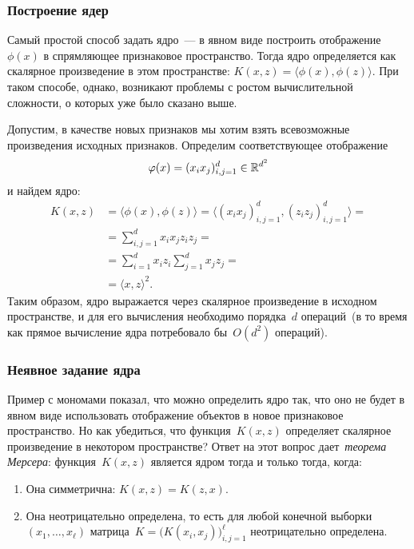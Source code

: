 \documentclass[12pt,fleqn]{article}
\begin{document}
\subsubsection{Построение ядер}
Самый простой способ задать ядро~--- в явном виде построить
отображение~$\phi(x)$ в спрямляющее признаковое пространство.
Тогда ядро определяется как скалярное произведение в этом
пространстве: $K(x, z) = \langle \phi(x), \phi(z) \rangle$.
При таком способе, однако, возникают проблемы с ростом вычислительной сложности,
о которых уже было сказано выше.

Допустим, в качестве новых признаков мы хотим взять всевозможные
произведения исходных признаков.
Определим соответствующее отображение
\[
    \varphi(x)
    =
    (x_i x_j)_{i, j = 1}^{d}
    \in
    \mathbb{R}^{d^2}
\]
и найдем ядро:
\begin{align*}
    K(x, z)
    &=
    \langle \phi(x), \phi(z) \rangle
    =
    \langle (x_i x_j)_{i, j = 1}^{d}, (z_i z_j)_{i, j = 1}^{d} \rangle
    =\\
    &=
    \sum_{i, j = 1}^{d}
        x_i x_j z_i z_j
    =\\
    &=
    \sum_{i = 1}^{d} x_i z_i
    \sum_{j = 1}^{d} x_j z_j
    =\\
    &=
    \langle x, z \rangle^2.
\end{align*}
Таким образом, ядро выражается через скалярное произведение
в исходном пространстве,
и для его вычисления необходимо порядка~$d$ операций~(в то время
как прямое вычисление ядра потребовало бы~$O(d^2)$ операций).

\subsubsection{Неявное задание ядра}
Пример с мономами показал, что можно определить ядро так,
что оно не будет в явном виде использовать отображение объектов
в новое признаковое пространство.
Но как убедиться, что функция~$K(x, z)$ определяет скалярное
произведение в некотором пространстве?
Ответ на этот вопрос дает~\emph{теорема Мерсера}:
функция~$K(x, z)$ является ядром тогда и только тогда, когда:
\begin{enumerate}
    \item Она симметрична: $K(x, z) = K(z, x)$.
    \item Она неотрицательно определена, то есть для
        любой конечной выборки~$(x_1, \dots, x_\ell)$
        матрица~$K = \bigl( K(x_i, x_j) \bigr)_{i, j = 1}^{\ell}$
        неотрицательно определена.
\end{enumerate}
\end{document}
